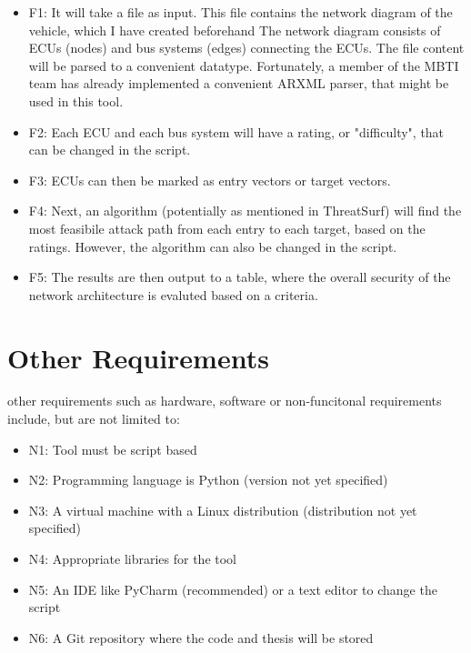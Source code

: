 \begin{itemize}

	\item F1\label{sec:f1}: It will take a file as input. 
		This file contains the network diagram of the vehicle, which I have created beforehand
		The network diagram consists of ECUs (nodes) and bus systems (edges) connecting the ECUs.
		The file content will be parsed to a convenient datatype.
		Fortunately, a member of the MBTI team has already implemented a convenient ARXML parser, that might be used in this tool.

\item F2\label{sec:f2}: Each ECU and each bus system will have a rating, or "difficulty", that can be changed in the script.
\item F3\label{sec:f3}: ECUs can then be marked as entry vectors or target vectors.

\item F4\label{sec:f4}: Next, an algorithm (potentially as mentioned in ThreatSurf\cite{threat_surf}) will find the most feasibile attack path from each entry to each target, 
		based on the ratings.
		However, the algorithm can also be changed in the script.

\item F5\label{sec:f5}: The results are then output to a table, 
		where the overall security of the network architecture is evaluted based on a criteria.

\end{itemize}

\section{Other Requirements}
\label{sec:hardware-software}

other requirements such as hardware, software or non-funcitonal requirements include, but are not limited to:

\begin{itemize}
	\item N1\label{sec:n1}: Tool must be script based
	\item N2\label{sec:n2}: Programming language is Python (version not yet specified)
	\item N3\label{sec:n3}: A virtual machine with a Linux distribution (distribution not yet specified)
	\item N4\label{sec:n4}: Appropriate libraries for the tool
	\item N5\label{sec:n5}: An IDE like PyCharm (recommended) or a text editor to change the script
	\item N6\label{sec:n6}: A Git repository where the code and thesis will be stored
\end{itemize}
